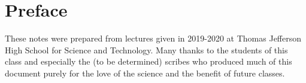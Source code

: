 \chapter{Preface}
These notes were prepared from lectures given in 2019-2020 at Thomas Jefferson High School for Science and Technology. Many thanks to 
the students of this class and especially the (to be determined)
scribes who produced much of this document purely for the love
of the science and the benefit of future classes.